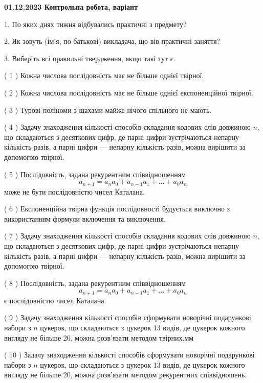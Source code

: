 \documentclass[12pt, ukrainian]{article}
\begin{document}
\vspace{4mm}
\newpage
\begin {large}

\textbf{01.12.2023 Контрольна робота, варіант  }\par


{
1. По яких днях тижня відбувались практичні з предмету?



\vspace{5mm}
2. Як зовуть (ім'я, по батькові) викладача, що вів практичні заняття?



\vspace{5mm}
3. Виберіть всі правильні твердження, якщо такі тут є.\par
\vspace{2mm}
( 1 ) Кожна числова послідовність має не більше однієї твірної.%

( 2 ) Кожна числова послідовність має не більше однієї  експоненційної твірної.%

( 3 ) Турові поліноми з шахами майже нічого спільного не мають.%

( 4 ) Задачу знаходження кількості способів складання кодових слів довжиною $n$, що складаються з десяткових цифр, де парні цифри зустрічаються непарну кількість разів, а парні цифри — непарну кількість разів, можна вирішити за допомогою твірної.%

( 5 ) Послідовність, задана рекурентним співвідношенням $$a_{n+1}=a_{n}a_{0}+a_{n-1}a_{1}+\ldots+a_0a_{n}$$ може не бути послідовністю чисел Каталана.%

( 6 ) Експоненційна твірна функція послідовності будується виключно з використанням формули включення та виключення.%

( 7 ) Задачу знаходження кількості способів складання кодових слів довжиною $n$, що складаються з десяткових цифр, де парні цифри зустрічаються непарну кількість разів, а парні цифри — непарну кількість разів, можна вирішити за допомогою твірної.%

( 8 ) Послідовність, задана рекурентним співвідношенням $$a_{n+1}=a_{n}a_{0}+a_{n-1}a_{1}+\ldots+a_0a_{n}$$ є послідовністю чисел Каталана.%

( 9 ) Задачу знаходження кількості способів сформувати новорічні подарункові набори з $n$ цукерок, що складаються з цукерок 13 видів, де цукерок кожного вигляду не більше 20, можна розв’язати методом твірних.мм%

( 10 ) Задачу знаходження кількості способів сформувати новорічні подарункові набори з $n$ цукерок, що складаються з цукерок 13 видів, де цукерок кожного вигляду не більше 20, можна розв’язати методом рекурентних співвідношень.%
}
\end {large}
\end{document}
